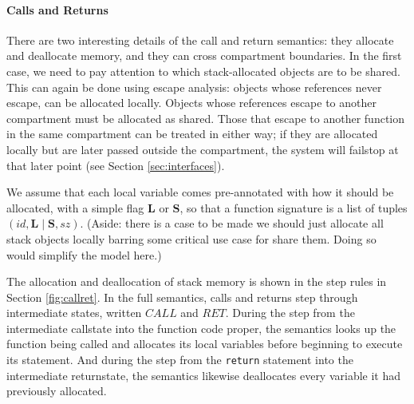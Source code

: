 \documentclass{article}
\begin{document}
\paragraph{Calls and Returns}

There are two interesting details of the call and return semantics:
they allocate and deallocate memory, and they can cross compartment boundaries.
In the first case, we need to pay attention to which stack-allocated
objects are to be shared. This can again be done using escape analysis:
objects whose references never escape, can be allocated locally. Objects whose
references escape to another compartment must be allocated as shared.
Those that escape to another function in the same compartment can be treated
in either way; if they are allocated locally but are later passed outside the
compartment, the system will failstop at that later point
(see Section \ref{sec:interfaces}).

We assume that each local variable comes pre-annotated with how it should
be allocated, with a simple flag \(\mathbf{L}\) or \(\mathbf{S}\), so that
a function signature is a list of tuples \((id,\mathbf{L} \mid \mathbf{S},sz)\).
(Aside: there is a case to be made we should just allocate all stack objects locally
barring some critical use case for share them. Doing so would simplify the model here.)

The allocation and deallocation of stack memory is shown in the step rules in
Section \ref{fig:callret}. In the full semantics, calls and returns step through
intermediate states, written \(\mathit{CALL}\) and \(\mathit{RET}\). During the
step from the intermediate callstate into the function code proper, the semantics
looks up the function being called and allocates its local variables before beginning
to execute its statement. And during the step from the {\tt return} statement into
the intermediate returnstate, the semantics likewise deallocates every variable it had
previously allocated.
\end{document}
